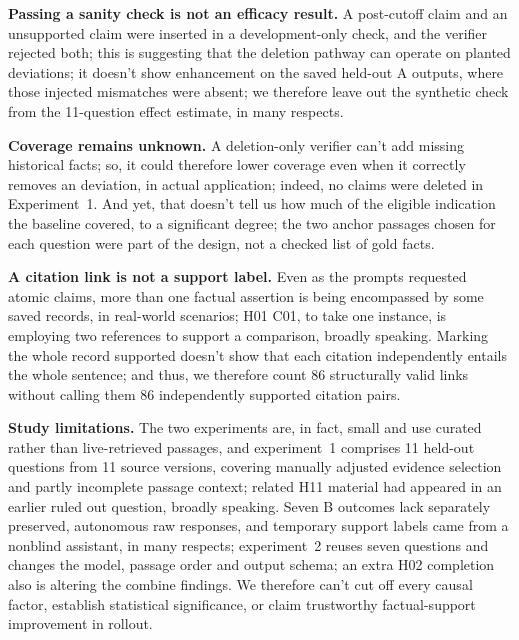 \documentclass[12pt,a4paper]{article}
\begin{document}
\textbf{Passing a sanity check is not an efficacy result.} A post-cutoff claim and an unsupported claim were inserted in a development-only check, and the verifier rejected both; this is suggesting that the deletion pathway can operate on planted deviations; it doesn't show enhancement on the saved held-out A outputs, where those injected mismatches were absent; we therefore leave out the synthetic check from the 11-question effect estimate, in many respects.

\textbf{Coverage remains unknown.} A deletion-only verifier can't add missing historical facts; so, it could therefore lower coverage even when it correctly removes an deviation, in actual application; indeed, no claims were deleted in Experiment~1. And yet, that doesn't tell us how much of the eligible indication the baseline covered, to a significant degree; the two anchor passages chosen for each question were part of the design, not a checked list of gold facts.

\textbf{A citation link is not a support label.} Even as the prompts requested atomic claims, more than one factual assertion is being encompassed by some saved records, in real-world scenarios; H01 C01, to take one instance, is employing two references to support a comparison, broadly speaking. Marking the whole record supported doesn't show that each citation independently entails the whole sentence; and thus, we therefore count 86 structurally valid links without calling them 86 independently supported citation pairs.

\textbf{Study limitations.} The two experiments are, in fact, small and use curated rather than live-retrieved passages, and experiment~1 comprises 11 held-out questions from 11 source versions, covering manually adjusted evidence selection and partly incomplete passage context; related H11 material had appeared in an earlier ruled out question, broadly speaking. Seven B outcomes lack separately preserved, autonomous raw responses, and temporary support labels came from a nonblind assistant, in many respects; experiment~2 reuses seven questions and changes the model, passage order and output schema; an extra H02 completion also is altering the combine findings. We therefore can't cut off every causal factor, establish statistical significance, or claim trustworthy factual-support improvement in rollout.
\end{document}
